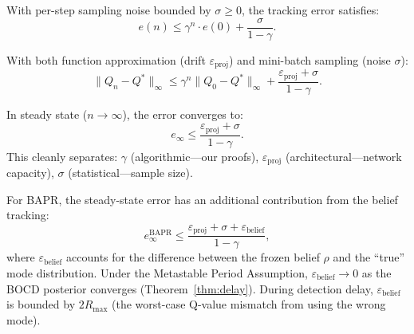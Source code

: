 \begin{theorem}
    \label{thm:stochastic}
    With per-step sampling noise bounded by $\sigma \geq 0$, the tracking error satisfies:
    \begin{equation}
        e(n) \leq \gamma^n \cdot e(0) + \frac{\sigma}{1 - \gamma}.
    \end{equation}
\end{theorem}

\begin{theorem}
    \label{thm:combined}
    With both function approximation (drift $\varepsilon_{\text{proj}}$) and mini-batch sampling (noise $\sigma$):
    \begin{equation}
        \|Q_n - Q^*\|_\infty \leq \gamma^n \|Q_0 - Q^*\|_\infty + \frac{\varepsilon_{\text{proj}} + \sigma}{1 - \gamma}.
    \end{equation}
\end{theorem}

\begin{corollary}
    In steady state ($n \to \infty$), the error converges to:
    \begin{equation}
        e_\infty \leq \frac{\varepsilon_{\text{proj}} + \sigma}{1 - \gamma}.
    \end{equation}
    This cleanly separates: $\gamma$ (algorithmic---our proofs), $\varepsilon_{\text{proj}}$ (architectural---network capacity), $\sigma$ (statistical---sample size).
\end{corollary}

\begin{remark}
    For BAPR, the steady-state error has an additional contribution from the belief tracking:
    \begin{equation}
        e_\infty^{\text{BAPR}} \leq \frac{\varepsilon_{\text{proj}} + \sigma + \varepsilon_{\text{belief}}}{1 - \gamma},
    \end{equation}
    where $\varepsilon_{\text{belief}}$ accounts for the difference between the frozen belief $\rho$ and the ``true'' mode distribution. Under the Metastable Period Assumption, $\varepsilon_{\text{belief}} \to 0$ as the BOCD posterior converges (Theorem~\ref{thm:delay}). During detection delay, $\varepsilon_{\text{belief}}$ is bounded by $2R_{\max}$ (the worst-case Q-value mismatch from using the wrong mode).
\end{remark}


